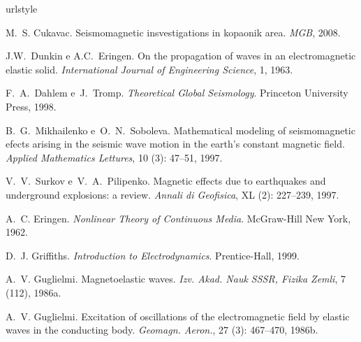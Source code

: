 \documentclass[12pt,a4paper,oneside]{abntex2}
\begin{document}



%


%

\begin{thebibliography}{25}
\providecommand{\natexlab}[1]{#1}
\providecommand{\url}[1]{\texttt{#1}}
\expandafter\ifx\csname urlstyle\endcsname\relax
  \providecommand{\doi}[1]{doi: #1}\else
  \providecommand{\doi}{doi: \begingroup \urlstyle{rm}\Url}\fi


M.~S. Cukavac.
\newblock Seismomagnetic insvestigations in kopaonik area.
\newblock \emph{MGB}, 2008.

J.W.~Dunkin e A.C.~Eringen.
\newblock On the propagation of waves in an electromagnetic elastic solid.
\newblock \emph{International Journal of Engineering Science}, 1, 1963.


F.~A.~Dahlem e~J.~Tromp.
\newblock \emph{Theoretical Global Seismology}.
\newblock Princeton University Press, 1998.

B.~G.~Mikhailenko e~O.~N.~Soboleva.
\newblock Mathematical modeling of seismomagnetic efects arising in the seismic
  wave motion in the earth's constant magnetic field.
\newblock \emph{Applied Mathematics Lettures}, 10 (3):
  47--51, 1997.

V.~V.~Surkov e~V.~A.~Pilipenko.
\newblock Magnetic effects due to earthquakes and underground explosions: a
  review.
\newblock \emph{Annali di Geofisica}, XL (2): 227--239, 1997.

A.~C. Eringen.
\newblock \emph{Nonlinear Theory of Continuous Media}.
\newblock McGraw-Hill New York, 1962.

D.~J. Griffiths.
\newblock \emph{Introduction to Electrodynamics}.
\newblock Prentice-Hall, 1999.

A.~V. Guglielmi.
\newblock Magnetoelastic waves.
\newblock \emph{Izv. Akad. Nauk SSSR, Fizika Zemli}, 7 (112), 1986a.

A.~V. Guglielmi.
\newblock Excitation of oscillations of the electromagnetic field by elastic
  waves in the conducting body.
\newblock \emph{Geomagn. Aeron.}, 27 (3): 467--470, 1986b.


\end{thebibliography}
\end{document}
